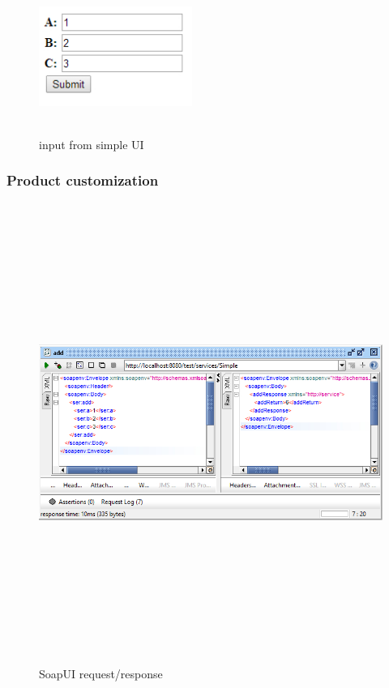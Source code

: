 \documentclass[12pt]{article}
\begin{document}
\begin{figure}[ht!]
\centering
\includegraphics[width=5cm,height=5cm,keepaspectratio]{img/ui.jpg}
\caption{input from simple UI}
\label{overflow}
\end{figure}

\subsubsection{Product customization}

	
\begin{figure}[ht!]
\centering
\includegraphics[width=15cm,height=15cm,keepaspectratio]{img/soapui.jpg}
\caption{SoapUI request/response}
\label{overflow}
\end{figure}
\end{document}
